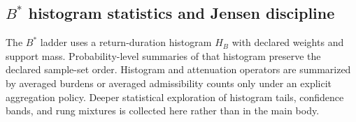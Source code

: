 \subsection{\texorpdfstring{$B^*$}{B*} histogram statistics and Jensen discipline}
The $B^*$ ladder uses a return-duration histogram $H_B$ with declared weights and support mass. Probability-level summaries of that histogram preserve the declared sample-set order. Histogram and attenuation operators are summarized by averaged burdens or averaged admissibility counts only under an explicit aggregation policy. Deeper statistical exploration of histogram tails, confidence bands, and rung mixtures is collected here rather than in the main body.
